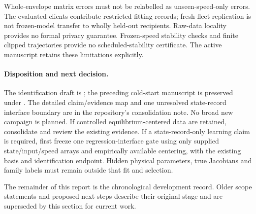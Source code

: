 Whole-envelope matrix errors must not be relabelled as unseen-speed-only errors.
The evaluated clients contribute restricted fitting records; fresh-fleet
replication is not frozen-model transfer to wholly held-out recipients.
Raw-data locality provides no formal privacy guarantee. Frozen-speed stability
checks and finite clipped trajectories provide no scheduled-stability certificate.
The active manuscript retains these limitations explicitly.

\paragraph{Disposition and next decision.}
The identification draft is ; the preceding cold-start
manuscript is preserved under . The detailed
claim/evidence map and one unresolved state-record interface boundary are in
the repository's consolidation note. No broad new campaign is planned.
If controlled equilibrium-centered data are retained, consolidate and review
the existing evidence. If a state-record-only learning claim is required, first
freeze one regression-interface gate using only supplied state/input/speed arrays
and empirically available centering, with the existing basis and identification
endpoint. Hidden physical parameters, true Jacobians and family labels must
remain outside that fit and selection.

The remainder of this report is the chronological development record. Older
scope statements and proposed next steps describe their original stage and
are superseded by this section for current work.
\clearpage

